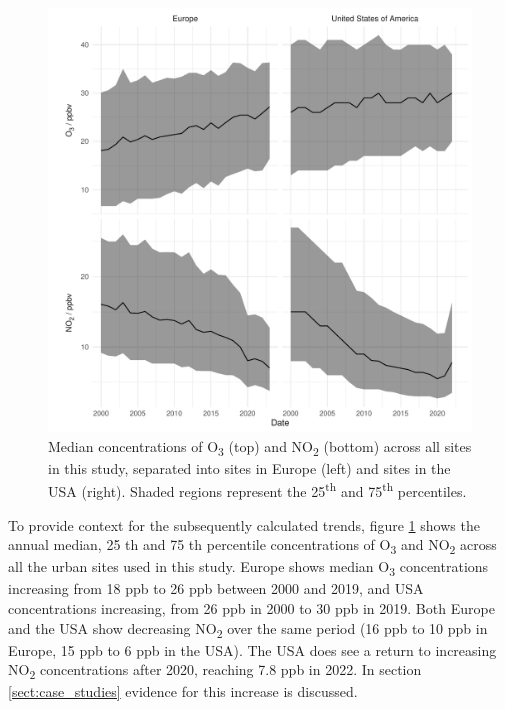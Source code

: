 \documentclass[journal abbreviation, manuscript]{copernicus}
\begin{document}
\begin{figure}[t]
\includegraphics[width=12cm]{figures/f2_conc.pdf}
\caption{Median concentrations of O\textsubscript{3} (top) and NO\textsubscript{2} (bottom) across all sites in this study, separated into sites in Europe (left) and sites in the USA (right).  Shaded regions represent the 25\textsuperscript{th} and 75\textsuperscript{th} percentiles.}
\label{fig:conc_plot}
\end{figure}

To provide context for the subsequently calculated trends, figure \ref{fig:conc_plot} shows the annual median, 25 th and 75 th percentile concentrations of O\textsubscript{3} and NO\textsubscript{2} across all the urban sites used in this study. Europe shows median O\textsubscript{3} concentrations increasing from 18 ppb to 26 ppb between 2000 and 2019, and USA concentrations increasing, from 26 ppb in 2000 to 30 ppb in 2019. Both Europe and the USA show decreasing NO\textsubscript{2} over the same period (16 ppb to 10 ppb in Europe, 15 ppb to 6 ppb in the USA). The USA does see a return to increasing NO\textsubscript{2} concentrations after 2020, reaching 7.8 ppb in 2022. In section \ref{sect:case_studies} evidence for this increase is discussed. 

\end{document}
